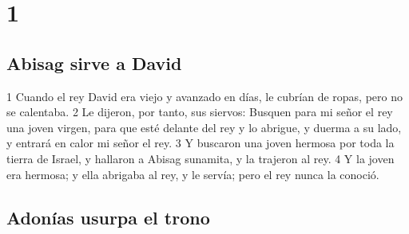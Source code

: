 
\chapter{1}

\section*{Abisag sirve a David}

1 Cuando el rey David era viejo y avanzado en días, le cubrían de ropas, pero no se calentaba.
2 Le dijeron, por tanto, sus siervos: Busquen para mi señor el rey una joven virgen, para que esté delante del rey y lo abrigue, y duerma a su lado, y entrará en calor mi señor el rey.
3 Y buscaron una joven hermosa por toda la tierra de Israel, y hallaron a Abisag sunamita, y la trajeron al rey.
4 Y la joven era hermosa; y ella abrigaba al rey, y le servía; pero el rey nunca la conoció.

\section*{Adonías usurpa el trono}


